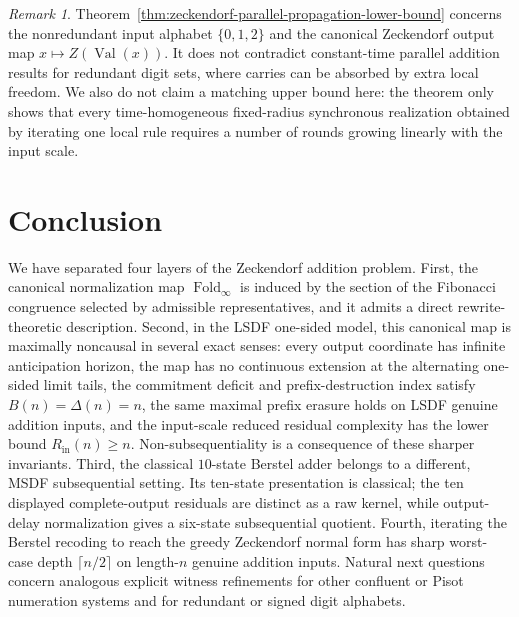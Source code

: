 \documentclass[11pt,letterpaper]{article}
\numberwithin{equation}{section}
\theoremstyle{plain}
\theoremstyle{definition}
\theoremstyle{remark}
\newtheorem{remark}[theorem]{Remark}
\DeclareMathOperator{\Val}{Val}
\DeclareMathOperator{\Fold}{Fold}
\begin{document}
\begin{remark}
Theorem~\ref{thm:zeckendorf-parallel-propagation-lower-bound} concerns the
nonredundant input alphabet $\{0,1,2\}$ and the canonical Zeckendorf output
map $x\mapsto Z(\Val(x))$.  It does not contradict constant-time parallel
addition results for redundant digit sets, where carries can be absorbed by
extra local freedom.  We also do not claim a matching upper bound here:
the theorem only shows that every time-homogeneous fixed-radius synchronous
realization obtained by iterating one local rule requires a number of rounds
growing linearly with the input scale.
\end{remark}

\section{Conclusion}

We have separated four layers of the Zeckendorf addition problem.  First, the
canonical normalization map $\Fold_\infty$ is induced by the section of the
Fibonacci congruence selected by admissible representatives, and it admits a direct
rewrite-theoretic description.  Second, in the LSDF one-sided model, this
canonical map is maximally noncausal in several exact senses: every output
coordinate has infinite anticipation horizon, the map has no continuous
extension at the alternating one-sided limit tails, the commitment deficit and
prefix-destruction index satisfy $B(n)=\Delta(n)=n$, the same maximal prefix
erasure holds on LSDF genuine addition inputs, and the input-scale reduced
residual complexity has the lower bound $R_{\mathrm{in}}(n)\ge n$.
Non-subsequentiality is a consequence of these sharper invariants.  Third,
the classical $10$-state Berstel adder
belongs to a different, MSDF subsequential setting.  Its ten-state
presentation is classical; the ten displayed complete-output residuals are
distinct as a raw kernel, while output-delay normalization gives a six-state
subsequential quotient.  Fourth, iterating the Berstel recoding to reach the
greedy Zeckendorf normal form has sharp worst-case depth
$\lceil n/2\rceil$ on length-$n$ genuine addition inputs.  Natural next
questions concern analogous explicit witness refinements for other confluent
or Pisot numeration systems and for redundant or signed digit alphabets.



\end{document}
